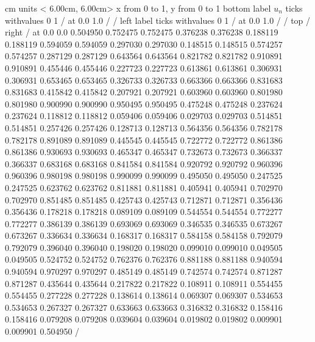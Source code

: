 \begin {center}
 cm  \beginpicture
\setcoordinatesystem units < 6.00cm, 6.00cm>
\setplotarea x from 0 to 1, y from 0 to 1
\axis bottom
  label $u_{n}$
  ticks withvalues        0        1  / at 0.0 1.0 / / 
\axis left
  label 
  ticks withvalues         0        1  / at 0.0 1.0 / / 
\axis top /  \axis right /
 at
   0.0        0.0
   0.504950   0.752475
   0.752475   0.376238
   0.376238   0.188119
   0.188119   0.594059
   0.594059   0.297030
   0.297030   0.148515
   0.148515   0.574257
   0.574257   0.287129
   0.287129   0.643564
   0.643564   0.821782
   0.821782   0.910891
   0.910891   0.455446
   0.455446   0.227723
   0.227723   0.613861
   0.613861   0.306931
   0.306931   0.653465
   0.653465   0.326733
   0.326733   0.663366
   0.663366   0.831683
   0.831683   0.415842
   0.415842   0.207921
   0.207921   0.603960
   0.603960   0.801980
   0.801980   0.900990
   0.900990   0.950495
   0.950495   0.475248
   0.475248   0.237624
   0.237624   0.118812
   0.118812   0.059406
   0.059406   0.029703
   0.029703   0.514851
   0.514851   0.257426
   0.257426   0.128713
   0.128713   0.564356
   0.564356   0.782178
   0.782178   0.891089
   0.891089   0.445545
   0.445545   0.722772
   0.722772   0.861386
   0.861386   0.930693
   0.930693   0.465347
   0.465347   0.732673
   0.732673   0.366337
   0.366337   0.683168
   0.683168   0.841584
   0.841584   0.920792
   0.920792   0.960396
   0.960396   0.980198
   0.980198   0.990099
   0.990099   0.495050
   0.495050   0.247525
   0.247525   0.623762
   0.623762   0.811881
   0.811881   0.405941
   0.405941   0.702970
   0.702970   0.851485
   0.851485   0.425743
   0.425743   0.712871
   0.712871   0.356436
   0.356436   0.178218
   0.178218   0.089109
   0.089109   0.544554
   0.544554   0.772277
   0.772277   0.386139
   0.386139   0.693069
   0.693069   0.346535
   0.346535   0.673267
   0.673267   0.336634
   0.336634   0.168317
   0.168317   0.584158
   0.584158   0.792079
   0.792079   0.396040
   0.396040   0.198020
   0.198020   0.099010
   0.099010   0.049505
   0.049505   0.524752
   0.524752   0.762376
   0.762376   0.881188
   0.881188   0.940594
   0.940594   0.970297
   0.970297   0.485149
   0.485149   0.742574
   0.742574   0.871287
   0.871287   0.435644
   0.435644   0.217822
   0.217822   0.108911
   0.108911   0.554455
   0.554455   0.277228
   0.277228   0.138614
   0.138614   0.069307
   0.069307   0.534653
   0.534653   0.267327
   0.267327   0.633663
   0.633663   0.316832
   0.316832   0.158416
   0.158416   0.079208
   0.079208   0.039604
   0.039604   0.019802
   0.019802   0.009901
   0.009901   0.504950
/ \endpicture
\end {center}
